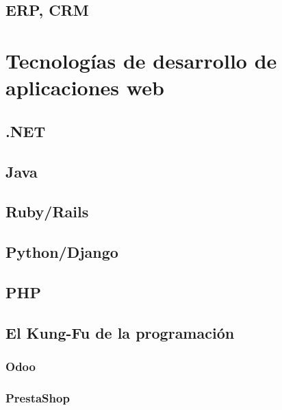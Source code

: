 \documentclass[a4paper,11pt,spanish]{sphinxmanual}
\begin{document}
\subsection{ERP, CRM}
\label{\detokenize{introduccion:erp-crm}}

\section{Tecnologías de desarrollo de aplicaciones web}
\label{\detokenize{introduccion:tecnologias-de-desarrollo-de-aplicaciones-web}}

\subsection{.NET}
\label{\detokenize{introduccion:net}}

\subsection{Java}
\label{\detokenize{introduccion:java}}

\subsection{Ruby/Rails}
\label{\detokenize{introduccion:ruby-rails}}

\subsection{Python/Django}
\label{\detokenize{introduccion:python-django}}

\subsection{PHP}
\label{\detokenize{introduccion:php}}

\subsection{El Kung-Fu de la programación}
\label{\detokenize{introduccion:el-kung-fu-de-la-programacion}}

\subsubsection{Odoo}
\label{\detokenize{introduccion:odoo}}

\subsubsection{PrestaShop}
\label{\detokenize{introduccion:prestashop}}
\end{document}
